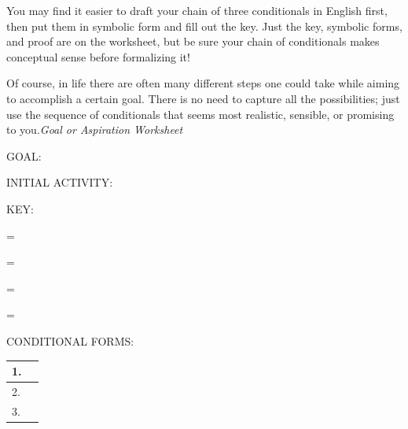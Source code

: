 \documentclass[oneside, openany]{book} %
\begin{document}
\noindent 

\noindent 

\noindent 

\noindent You may find it easier to draft your chain of three conditionals in English first, then put them in symbolic form and fill out the key. Just the key, symbolic forms, and proof are on the worksheet, but be sure your chain of conditionals makes conceptual sense before formalizing it!

\noindent Of course, in life there are often many different steps one could take while aiming to accomplish a certain goal. There is no need to capture all the possibilities; just use the sequence of conditionals that seems most realistic, sensible, or promising to you.\textit{Goal or Aspiration Worksheet}

\noindent 

\noindent 

\noindent 

\noindent 

\noindent GOAL:

\noindent 

\noindent 

\noindent 

\noindent 

\noindent INITIAL ACTIVITY:

\noindent 

\noindent 

\noindent 

\noindent 

\noindent KEY:

\noindent 

\noindent \underbar{      } = \underbar{ }

\noindent 

\noindent \underbar{      } = \underbar{ }

\noindent 

\noindent \underbar{      } = \underbar{ }

\noindent 

\noindent \underbar{      } = \underbar{ }

\noindent 

\noindent 

\noindent 

\noindent 

\noindent CONDITIONAL FORMS:

\noindent 

\begin{tabular}{|p{0.3in}|p{1.1in}|} \hline 
1. & \underbar{ } \\ \hline 
2. & \underbar{ } \\ \hline 
3. & \underbar{ } \\ \hline 
\end{tabular}
\end{document}
